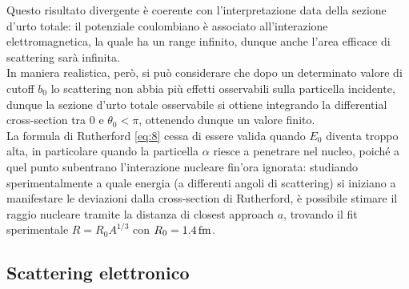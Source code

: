 Questo risultato divergente è coerente con l'interpretazione data della sezione d'urto totale: il potenziale coulombiano è associato all'interazione elettromagnetica, la quale ha un range infinito, dunque anche l'area efficace di scattering sarà infinita.\\
In maniera realistica, però, si può considerare che dopo un determinato valore di cutoff $ b_0 $ lo scattering non abbia più effetti osservabili sulla particella incidente, dunque la sezione d'urto totale osservabile si ottiene integrando la differential cross-section tra $ 0 $ e $ \theta_0 < \pi$, ottenendo dunque un valore finito.\\
La formula di Rutherford \ref{eq:8} cessa di essere valida quando $ E_0 $ diventa troppo alta, in particolare quando la particella $ \alpha $ riesce a penetrare nel nucleo, poiché a quel punto subentrano l'interazione nucleare fin'ora ignorata: studiando sperimentalmente a quale energia (a differenti angoli di scattering) si iniziano a manifestare le deviazioni dalla cross-section di Rutherford, è possibile stimare il raggio nucleare tramite la distanza di closest approach $ a $, trovando il fit sperimentale $ R = R_0 A^{1/3} $ con $ R_0 = 1.4\,\mathrm{fm} $.

\subsection{Scattering elettronico}

